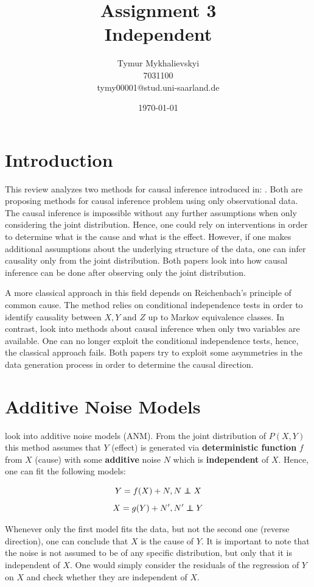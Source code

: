 \documentclass{article}
\title{\vspace{-2cm}Assignment 3\\
    Independent}
\author{Tymur Mykhalievskyi\\ 7031100\\ tymy00001@stud.uni-saarland.de}
\date{\today}
\newcommand\indep{\protect\mathpalette{\protect\independenT}{\perp}}
\def\independenT#1#2{\mathrel{\rlap{$#1#2$}\mkern2mu{#1#2}}}
\begin{document}
\maketitle

\section{Introduction}
This review analyzes two methods for causal inference introduced in: \cite{peters2011,janzing2010}. Both are proposing methods for causal inference problem using only observational data. The causal inference is impossible without any further assumptions when only considering the joint distribution. Hence, one could rely on interventions in order to determine what is the cause and what is the effect. However, if one makes additional assumptions about the underlying structure of the data, one can infer causality only from the joint distribution. Both papers look into how causal inference can be done after observing only the joint distribution. 

A more classical approach in this field depends on Reichenbach's principle of common cause. The method relies on conditional independence tests in order to identify causality between $X,Y \text{ and } Z$ up to Markov equivalence classes. In contrast, \cite{peters2011,janzing2010} look into methods about causal inference when only two variables are available. One can no longer exploit the conditional independence tests, hence, the classical approach fails. Both papers try to exploit some asymmetries in the data generation process in order to determine the causal direction.

\section{Additive Noise Models}
\cite{peters2011} look into additive noise models (ANM). From the joint distribution of $P(X,Y)$ this method assumes that $Y$ (effect) is generated via \textbf{deterministic function} $f$ from $X$ (cause) with some \textbf{additive} noise $N$ which is \textbf{independent} of $X$. Hence, one can fit the following models:

$$Y=f(X) + N, N\indep X$$
$$X=g(Y) + N', N'\indep Y$$

Whenever only the first model fits the data, but not the second one (reverse direction), one can conclude that $X$ is the cause of $Y$. It is important to note that the noise is not assumed to be of any specific distribution, but only that it is independent of $X$. One would simply consider the residuals of the regression of $Y$ on $X$ and check whether they are independent of $X$. 
\end{document}
